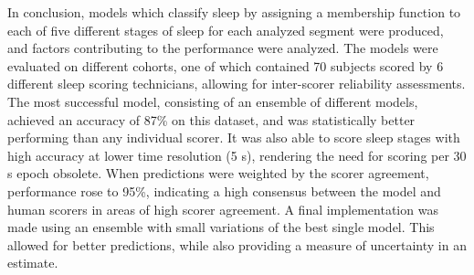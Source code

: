 In conclusion, models which classify sleep by assigning a membership function to each of five different stages of sleep for each analyzed segment were produced, and factors contributing to the performance were analyzed. 
The models were evaluated on different cohorts, one of which contained 70 subjects scored by 6 different sleep scoring technicians, allowing for inter-scorer reliability assessments.
The most successful model, consisting of an ensemble of different models, achieved an accuracy of 87\% on this dataset, and was statistically better performing than any individual scorer.
It was also able to score sleep stages with high accuracy at lower time resolution (5 s), rendering the need for scoring per 30 s epoch obsolete.
When predictions were weighted by the scorer agreement, performance rose to 95\%, indicating a high consensus between the model and human scorers in areas of high scorer agreement.
A final implementation was made using an ensemble with small variations of the best single model.
This allowed for better predictions, while also providing a measure of uncertainty in an estimate.
